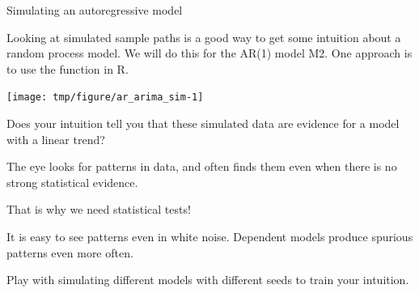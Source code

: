 \begin{frame}[fragile]{Simulating an autoregressive model}


Looking at simulated sample paths is a good way to get some intuition about a random process model. 
We will do this for the AR(1) model M2.
One approach is to use the  function in R.


\begin{knitrout}\small
{}\color{fgcolor}\begin{kframe}
\begin{alltt}
\hldef{(}\hldef{)}
 \hlkwb{<-} \hldef{(}\hldef{(}\hldef{=}\hldef{),}\hldef{=}\hldef{,}\hldef{=}\hldef{)}
\hldef{=}\hldef{)}
\end{alltt}
\end{kframe}
\end{knitrout}


\begin{knitrout}\small
{}\color{fgcolor}

{\centering \texttt{[image: tmp/figure/ar\_arima\_sim-1]} 

}


\end{knitrout}

\end{frame}

\begin{frame}[fragile]
\bi

\item Does your intuition tell you that these simulated data are evidence for a model with a linear trend?

\item The eye looks for patterns in data, and often finds them even when there is no strong statistical evidence. 

\item That is why we need statistical tests!

\item It is easy to see patterns even in white noise. Dependent models produce spurious patterns even more often.

\item Play with simulating different models with different seeds to train your intuition.

\ei

\end{frame}

